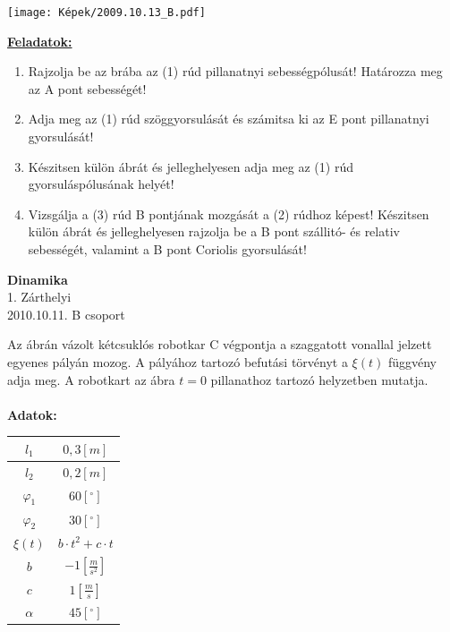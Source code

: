 \documentclass[11pt,a4paper]{article}
\begin{document}
\begin{center}
    \texttt{[image: Képek/2009.10.13\_B.pdf]}
\end{center}

\vspace{2em}
\underline{\textbf{Feladatok:}}
\begin{enumerate}
    \item Rajzolja be az brába az (1) rúd pillanatnyi sebességpólusát! Határozza meg az A pont
    sebességét!
    \item Adja meg az (1) rúd szöggyorsulását és számitsa ki az E pont pillanatnyi gyorsulását!
    \item Készitsen külön ábrát és jelleghelyesen adja meg az (1) rúd gyorsuláspólusának helyét!
    \item Vizsgálja a (3) rúd B pontjának mozgását a (2) rúdhoz képest! Készitsen külön ábrát és
    jelleghelyesen rajzolja be a B pont szállitó- és relativ sebességét, valamint a B pont Coriolis gyorsulását!
\end{enumerate}
\newpage

\begin{center}
    \textbf{\LARGE{Dinamika}}\\
    1. Zárthelyi\\
    2010.10.11. B csoport
\end{center}
Az ábrán vázolt kétcsuklós robotkar C végpontja a szaggatott vonallal jelzett egyenes pályán mozog. A pályához tartozó befutási törvényt a \(\xi(t)\) függvény adja meg. A robotkart az ábra \(t = 0\) pillanathoz tartozó helyzetben mutatja.\\\\
\textbf{Adatok:}\\
\begin{tabular}{| c | c |}
    \hline
    $l_1 $&$ 0,3 [m]$\\
    \hline
    $l_2 $&$ 0,2 [m]$\\
    \hline
    $\varphi_1 $&$ 60 [^\circ]$\\ 
    \hline
    $\varphi_2 $&$ 30 [^\circ]$\\
    \hline
    $\xi(t) $&$ b \cdot t^2 + c \cdot t$\\
    \hline
    $b $&$ -1 \left[\frac{m}{s^2}\right]$\\
    \hline
    $c $&$ 1 \left[\frac{m}{s}\right]$\\
    \hline
    $\alpha $&$ 45 [^\circ]$\\
    \hline

\end{tabular}
\end{document}
